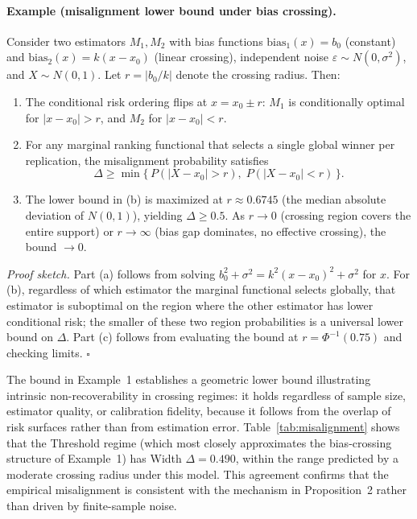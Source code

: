 \documentclass[pdflatex,sn-mathphys-ay]{sn-jnl}%
\theoremstyle{thmstyleone}%
\theoremstyle{thmstyletwo}%
\theoremstyle{thmstylethree}%
\begin{document}
\paragraph{Example (misalignment lower bound under bias crossing).}
Consider two estimators $M_1, M_2$ with bias functions $\text{bias}_1(x) = b_0$ (constant) and $\text{bias}_2(x) = k(x - x_0)$ (linear crossing), independent noise $\varepsilon \sim N(0, \sigma^2)$, and $X \sim N(0, 1)$. Let $r = |b_0 / k|$ denote the crossing radius. Then:
\begin{enumerate}
    \item[(a)] The conditional risk ordering flips at $x = x_0 \pm r$: $M_1$ is conditionally optimal for $|x - x_0| > r$, and $M_2$ for $|x - x_0| < r$.
    \item[(b)] For any marginal ranking functional that selects a single global winner per replication, the misalignment probability satisfies
    \begin{equation}
        \Delta \geq \min\bigl\{\,P(|X - x_0| > r),\; P(|X - x_0| < r)\,\bigr\}.
        \label{eq:delta-lower-bound}
    \end{equation}
    \item[(c)] The lower bound in (b) is maximized at $r \approx 0.6745$ (the median absolute deviation of $N(0,1)$), yielding $\Delta \geq 0.5$. As $r \to 0$ (crossing region covers the entire support) or $r \to \infty$ (bias gap dominates, no effective crossing), the bound $\to 0$.
\end{enumerate}
\emph{Proof sketch.} Part (a) follows from solving $b_0^2 + \sigma^2 = k^2(x - x_0)^2 + \sigma^2$ for $x$. For (b), regardless of which estimator the marginal functional selects globally, that estimator is suboptimal on the region where the other estimator has lower conditional risk; the smaller of these two region probabilities is a universal lower bound on $\Delta$. Part (c) follows from evaluating the bound at $r = \Phi^{-1}(0.75)$ and checking limits. $\square$

The bound in Example~1 establishes a geometric lower bound illustrating intrinsic non-recoverability in crossing regimes: it holds regardless of sample size, estimator quality, or calibration fidelity, because it follows from the overlap of risk surfaces rather than from estimation error. Table~\ref{tab:misalignment} shows that the Threshold regime (which most closely approximates the bias-crossing structure of Example~1) has Width $\Delta = 0.490$, within the range predicted by a moderate crossing radius under this model. This agreement confirms that the empirical misalignment is consistent with the mechanism in Proposition~2 rather than driven by finite-sample noise.
\end{document}
